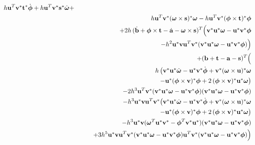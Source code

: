 \begin{eqnarray}
        h\ve{u}^T\dual{\ve{v}}\dual{\ve{t}}\dot{\ve{\phi}} +
        h\ve{u}^T\dual{\ve{v}}\dual{\ve{s}}\dot{\ve{\omega}} + \nonumber\\*&&
        h\ve{u}^T\dual{\ve{v}}\dual{(\ve{\omega}\times\ve{s})}\ve{\omega} -
        h\ve{u}^T\dual{\ve{v}}\dual{(\ve{\phi}\times\ve{t})}\ve{\phi} \nonumber\\*&&
        +2h\,(\dot{\ve{b}} + \ve{\phi}\times\ve{t} - \dot{\ve{a}} - \ve{\omega}\times\ve{s})^T
        \Big(\dual{\ve{v}}\dual{\ve{u}}\ve{\omega} - \dual{\ve{u}}\dual{\ve{v}}\ve{\phi}
        \nonumber\\*&&\quad\quad -h^2\dual{\ve{u}}\ve{v}\ve{u}^T\dual{\ve{v}}
        (\dual{\ve{v}}\dual{\ve{u}}\ve{\omega} - \dual{\ve{u}}\dual{\ve{v}}\ve{\phi})\Big)
        \nonumber\\*&& +(\ve{b} + \ve{t} - \ve{a} - \ve{s})^T \Big(
        \nonumber\\*&&\quad\quad h\,\big(
        \dual{\ve{v}}\dual{\ve{u}}\dot{\ve{\omega}} - \dual{\ve{u}}\dual{\ve{v}}\dot{\ve{\phi}} +
        \dual{\ve{v}}\dual{(\ve{\omega}\times\ve{u})}\ve{\omega} \nonumber\\*&&\quad\quad\quad\quad
        -\dual{\ve{u}}\dual{(\ve{\phi}\times\ve{v})}\ve{\phi} +
        2\,\dual{(\ve{\phi}\times\ve{v})}\dual{\ve{u}}\ve{\omega} \big)
        \nonumber\\*&&\quad\quad
        -2h^3 \ve{u}^T\dual{\ve{v}}
        (\dual{\ve{v}}\dual{\ve{u}}\ve{\omega} - \dual{\ve{u}}\dual{\ve{v}}\ve{\phi})
        (\dual{\ve{v}}\dual{\ve{u}}\ve{\omega} - \dual{\ve{u}}\dual{\ve{v}}\ve{\phi})
        \nonumber\\*&&\quad\quad
        -h^3\dual{\ve{u}}\ve{v}\ve{u}^T\dual{\ve{v}} \big(
        \dual{\ve{v}}\dual{\ve{u}}\dot{\ve{\omega}} - \dual{\ve{u}}\dual{\ve{v}}\dot{\ve{\phi}} +
        \dual{\ve{v}}\dual{(\ve{\omega}\times\ve{u})}\ve{\omega} \nonumber\\*&&\quad\quad\quad\quad
        -\dual{\ve{u}}\dual{(\ve{\phi}\times\ve{v})}\ve{\phi} +
        2\,\dual{(\ve{\phi}\times\ve{v})}\dual{\ve{u}}\ve{\omega} \big)
        \nonumber\\*&&\quad\quad
        -h^3 \dual{\ve{u}}\ve{v}
        (\ve{\omega}^T\dual{\ve{u}}\dual{\ve{v}} - \ve{\phi}^T\dual{\ve{v}}\dual{\ve{u}})
        (\dual{\ve{v}}\dual{\ve{u}}\ve{\omega} - \dual{\ve{u}}\dual{\ve{v}}\ve{\phi})
        \nonumber\\*&&\quad\quad
        +3h^5 \dual{\ve{u}}\ve{v} \ve{u}^T\dual{\ve{v}}
        (\dual{\ve{v}}\dual{\ve{u}}\ve{\omega} - \dual{\ve{u}}\dual{\ve{v}}\ve{\phi})
        \ve{u}^T\dual{\ve{v}}
        (\dual{\ve{v}}\dual{\ve{u}}\ve{\omega} - \dual{\ve{u}}\dual{\ve{v}}\ve{\phi}) \Big) \nonumber
\end{eqnarray}

